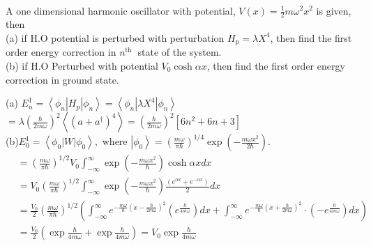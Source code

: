 \begin{enumerate}
\begin{answer}
\begin{align*}
	\end{align*}
\end{answer}
	\begin{minipage}{\textwidth}
	\item A one dimensional harmonic oscillator with potential, $V(x)=\frac{1}{2} m \omega^{2} x^{2}$ is given, then\\
	(a) if H.O potential is perturbed with perturbation $H_{p}=\lambda X^{4}$, then find the first order energy correction in $n^{\text {th }}$ state of the system.\\
	(b) if H.O Perturbed with potential $V_{0} \cosh \alpha x$, then find the first order energy correction in ground state.
\end{minipage}
\begin{answer}
(a)	$E_{n}^{1}=\left\langle\phi_{n}\left|H_{p}\right| \phi_{n}\right\rangle=\left\langle\phi_{n}\left|\lambda X^{4}\right| \phi_{n}\right\rangle$\\
	$=\lambda\left(\frac{\hbar}{2 m \omega}\right)^{2}\left\langle\left(a+a^{\dagger}\right)^{4}\right\rangle=\left(\frac{\hbar}{2 m \omega}\right)^{2}\left[6 n^{2}+6 n+3\right]$\\
	(b)$ E_{0}^{1}=\left\langle\phi_{0}|W| \phi_{0}\right\rangle, \text { where }\left|\phi_{0}\right\rangle=\left(\frac{m \omega}{\pi \hbar}\right)^{1 / 4} \exp \left(-\frac{m \omega x^{2}}{2 \hbar}\right) \text {. }$\\
	\begin{align*}
		&=\left(\frac{m \omega}{\pi \hbar}\right)^{1 / 2} V_{0} \int_{-\infty}^{\infty} \exp \left(-\frac{m \omega x^{2}}{\hbar}\right) \cosh \alpha x d x \\
		&=V_{0}\left(\frac{m \omega}{\pi \hbar}\right)^{1 / 2} \int_{-\infty}^{\infty} \exp \left(-\frac{m \omega x^{2}}{\hbar}\right) \frac{\left(e^{\alpha x}+e^{-\alpha x}\right)}{2} d x \\
		&=\frac{V_{0}}{2}\left(\frac{m \omega}{\pi \hbar}\right)^{1 / 2}\left(\int_{-\infty}^{\infty} e^{-\frac{m \omega}{\hbar}\left(x-\frac{\hbar}{2 m \omega}\right)^{2}}\left(e^{\frac{\hbar}{4 m \omega}}\right) d x+\int_{-\infty}^{\infty} e^{-\frac{m \omega}{\hbar}\left(x+\frac{\hbar}{2 m \omega}\right)^{2}} \cdot\left(-e^{\frac{\hbar}{4 m \omega}}\right) d x\right) \\
		&=\frac{V_{0}}{2}\left(\exp \frac{\hbar}{4 m \omega}+\exp \frac{\hbar}{4 m \omega}\right)=V_{0} \exp \frac{\hbar}{4 m \omega}
	\end{align*}
\end{answer}
	\begin{minipage}{\textwidth}

\end{minipage}
\end{enumerate}

